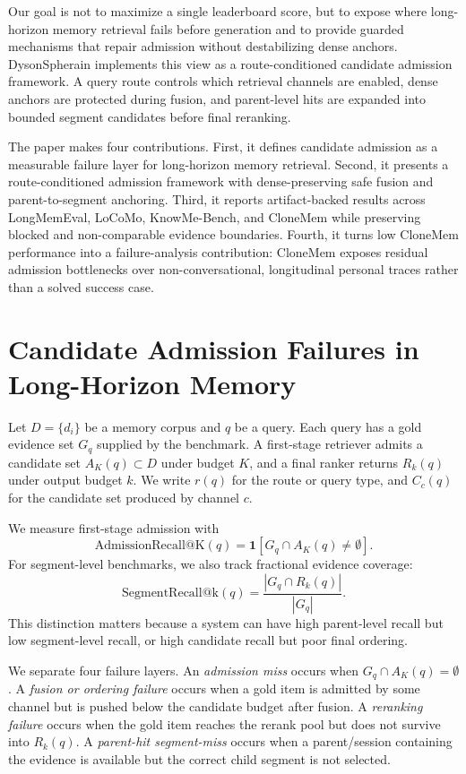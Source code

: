 \documentclass[10pt]{article}
\newcommand{\system}{DysonSpherain}
\begin{document}
Our goal is not to maximize a single leaderboard score, but to expose where
long-horizon memory retrieval fails before generation and to provide guarded
mechanisms that repair admission without destabilizing dense anchors.
\system{} implements this view as a route-conditioned candidate admission
framework. A query route controls which retrieval channels are enabled, dense
anchors are protected during fusion, and parent-level hits are expanded into
bounded segment candidates before final reranking.

The paper makes four contributions. First, it defines candidate admission as a
measurable failure layer for long-horizon memory retrieval. Second, it presents
a route-conditioned admission framework with dense-preserving safe fusion and
parent-to-segment anchoring. Third, it reports artifact-backed results across
LongMemEval, LoCoMo, KnowMe-Bench, and CloneMem while preserving blocked and
non-comparable evidence boundaries. Fourth, it turns low CloneMem performance
into a failure-analysis contribution: CloneMem exposes residual admission
bottlenecks over non-conversational, longitudinal personal traces rather than a
solved success case.

\section{Candidate Admission Failures in Long-Horizon Memory}

Let $D=\{d_i\}$ be a memory corpus and $q$ be a query. Each query has a gold
evidence set $G_q$ supplied by the benchmark. A first-stage retriever admits a
candidate set $A_K(q)\subset D$ under budget $K$, and a final ranker returns
$R_k(q)$ under output budget $k$. We write $r(q)$ for the route or query type,
and $C_c(q)$ for the candidate set produced by channel $c$.

We measure first-stage admission with
\[
\mathrm{AdmissionRecall@K}(q)=\mathbf{1}[G_q \cap A_K(q)\ne \emptyset].
\]
For segment-level benchmarks, we also track fractional evidence coverage:
\[
\mathrm{SegmentRecall@k}(q)=\frac{|G_q \cap R_k(q)|}{|G_q|}.
\]
This distinction matters because a system can have high parent-level recall but
low segment-level recall, or high candidate recall but poor final ordering.

We separate four failure layers. An \emph{admission miss} occurs when
$G_q \cap A_K(q)=\emptyset$. A \emph{fusion or ordering failure} occurs when a
gold item is admitted by some channel but is pushed below the candidate budget
after fusion. A \emph{reranking failure} occurs when the gold item reaches the
rerank pool but does not survive into $R_k(q)$. A \emph{parent-hit
segment-miss} occurs when a parent/session containing the evidence is
available but the correct child segment is not selected.
\end{document}
